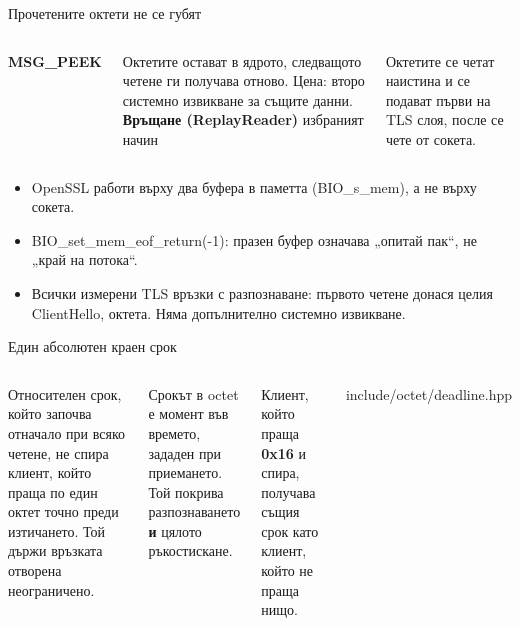 \documentclass[aspectratio=169, 11pt]{beamer}
\newcommand{\code}[1]{{\ttfamily #1}}
\newcommand{\hex}[1]{{\ttfamily\bfseries #1}}
\newcommand{\src}[1]{{\color{muted}\scriptsize #1}}
\begin{document}
\begin{frame}{Прочетените октети не се губят}
\begin{columns}[T]
\textbf{\code{MSG\_PEEK}}\par
Октетите остават в ядрото, следващото четене ги получава отново.
Цена: второ системно извикване за същите данни.
\textbf{Връщане (\code{ReplayReader})} \src{избраният начин}\par
Октетите се четат наистина и се подават първи на TLS слоя, после се чете от сокета.
\end{columns}
\vspace{1em}
\begin{itemize}
\item OpenSSL работи върху два буфера в паметта (\code{BIO\_s\_mem}), а не върху сокета.
\item \code{BIO\_set\_mem\_eof\_return(-1)}: празен буфер означава „опитай пак“, не „край на потока“.
\item Всички \winTotal{} измерени TLS връзки с разпознаване: първото четене донася целия
  ClientHello, \winFirstReadMedian{} октета. Няма допълнително системно извикване.
\end{itemize}
\end{frame}

\begin{frame}[fragile]{Един абсолютен краен срок}
\begin{columns}[T]
Относителен срок, който започва отначало при всяко четене, не спира клиент, който праща
по един октет точно преди изтичането. Той държи връзката отворена неограничено.\par\medskip
Срокът в \code{octet} е \alert{момент във времето}, зададен при приемането. Той покрива
разпознаването \textbf{и} цялото ръкостискане.\par\medskip
{\small Клиент, който праща \hex{0x16} и спира, получава същия срок като клиент, който не праща нищо.\par}

\src{include/octet/deadline.hpp}
\end{columns}
\end{frame}
\end{document}
